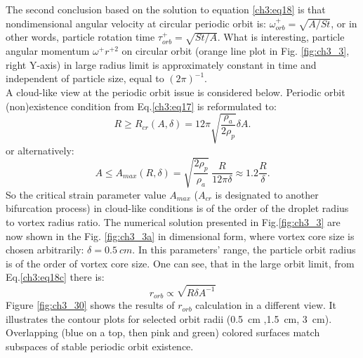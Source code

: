 \documentclass[../main.tex]{subfiles}
\begin{document}
The second conclusion based on the solution to equation \ref{ch3:eq18} is that nondimensional angular velocity at circular periodic orbit is: $\omega^{+}_{orb}=\sqrt{A/St}$, or in other words, particle rotation time $\tau^+_{orb}=\sqrt{St/A}$. What is interesting, particle angular momentum $\omega^{+} r^{+ 2}$ on circular orbit (orange line plot in Fig. \ref{fig:ch3_3}, right Y-axis) in large radius limit is approximately constant in time and independent of particle size, equal to $(2 \pi)^{-1}$. \\
A cloud-like view at the periodic orbit issue is considered below. Periodic orbit (non)existence condition from Eq.\ref{ch3:eq17} is reformulated to:
\begin{equation}
R \geq R_{cr}(A,\delta)=12 \pi \sqrt{\frac{\rho_a}{2\rho_p}}\delta A.
\label{ch3:eq19a}
\end{equation}
or alternatively:
\begin{equation}
A \leq A_{max}(R,\delta)=\sqrt{\frac{2\rho_p}{\rho_a}}\  \frac{R}{12 \pi \delta}\approx 1.2 \frac{R}{\delta}.
\label{ch3:eq19a}
\end{equation}
So the critical strain parameter value $A_{max}$ ($A_{cr}$ is designated to another bifurcation process) in cloud-like conditions is of the order of the droplet radius to vortex radius ratio.
The numerical solution presented in Fig.\ref{fig:ch3_3} are now shown in the Fig. \ref{fig:ch3_3a} in dimensional form, where vortex core size is chosen arbitrarily: $\delta=0.5~cm$. In this parameters' range, the particle orbit radius is of the order of vortex core size. One can see, that in the large orbit limit, from Eq.\ref {ch3:eq18c} there is:
\begin{equation}
r_{orb}\propto \sqrt{R \delta A^{-1}}
\label{ch3:eq19b}
\end{equation}
Figure \ref{fig:ch3_30} shows the results of $r_{orb}$ calculation in a different view. It illustrates the contour plots for selected orbit radii (0.5~cm ,1.5~cm, 3~cm). Overlapping (blue on a top, then pink and green) colored surfaces match subspaces of stable periodic orbit existence.
\end{document}
